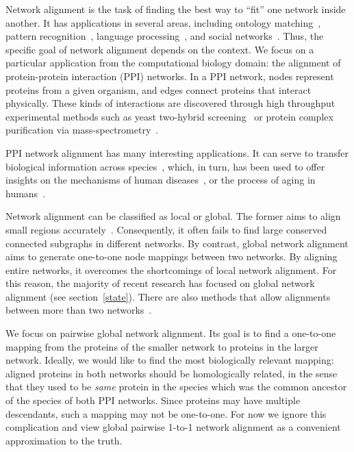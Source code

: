 \documentclass{bioinfo}
\begin{document}
Network alignment is the task of finding the best way to ``fit'' one network inside another.
It has applications in several areas, including ontology matching~\citep{DBLP:journals/tkde/LiTLL09}, pattern recognition~\citep{Zaslavskiy:2009:PFA:1638615.1639283}, language processing~\citep{bayati2009-network-alignment}, and social networks~\citep{DBLP:journals/corr/ZhangT13}.
Thus, the specific goal of network alignment depends on the context. We focus on a particular application from the computational biology domain: the alignment of protein-protein interaction (PPI) networks. In a PPI network, nodes represent proteins from a given organism, and edges connect proteins that interact physically. These kinds of interactions are discovered through high throughput experimental methods such as yeast two-hybrid screening~\citep{Ito01022000} or protein
complex purification via mass-spectrometry~\citep{16554755}.

PPI network alignment has many interesting applications. It can serve to transfer biological information across species~\citep{GRAAL}, which, in turn, has been used to offer insights on the mechanisms of human diseases~\citep{bioinflmu-567}, or the process of aging in humans~\citep{Milenkovic:2013:GNA:2506583.2508968}.

Network alignment can be classified as local or global. The former aims to align small regions accurately~\citep{PathBlast}. Consequently, it often fails to find large conserved connected subgraphs in different networks. By contrast, global network alignment aims to generate one-to-one node mappings
between two networks. By aligning entire networks, it overcomes the shortcomings of local network alignment. For this reason, the majority of recent research has focused on global network alignment (see section~\ref{state}). There are also methods that allow alignments between more than two networks~\citep{IsoRankN,netcoffee}.

We focus on pairwise global network alignment. Its goal is to find a one-to-one mapping from the proteins of the smaller network to proteins in the larger network. Ideally, we would like to find the most biologically relevant mapping: aligned proteins in both networks should be homologically related, in the sense that they used to be {\it same} protein in the species which was the common ancestor of the species of both PPI networks. Since proteins may have multiple descendants, such a mapping may not be one-to-one. For now we ignore this complication and view global pairwise 1-to-1 network alignment as a convenient approximation to the truth.
\end{document}
